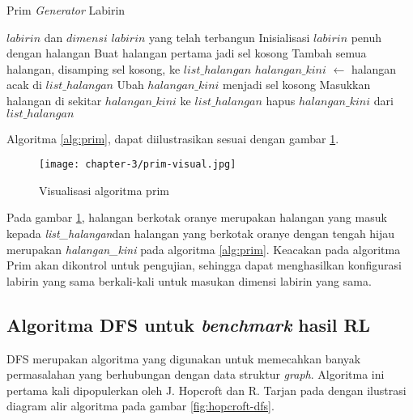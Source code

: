 \begin{algorithm}
	\makeatletter
	\renewcommand{\ALG@name}{Algoritma}
	\makeatother
	\caption{Prim \textit{Generator} Labirin}\label{alg:prim}
	\renewcommand{\algorithmicrequire}{\textbf{Masukan:}}
	\renewcommand{\algorithmicensure}{\textbf{Keluaran:}}
	\begin{algorithmic}[1]
		\Require $labirin$ dan $dimensi$
		\Ensure $labirin$ yang telah terbangun
		\State Inisialisasi $labirin$ penuh dengan halangan
		\State Buat halangan pertama jadi sel kosong
		\State Tambah semua halangan, disamping sel kosong, ke $list\_halangan$
		\State $halangan\_kini$ $\gets$ halangan acak di $list\_halangan$
		\State Ubah $halangan\_kini$ menjadi sel kosong
		\State Masukkan halangan di sekitar $halangan\_kini$ ke $list\_halangan$
		\EndIf
		\State hapus $halangan\_kini$ dari $list\_halangan$
		\EndWhile
	\end{algorithmic}
\end{algorithm}

Algoritma \ref{alg:prim}, dapat diilustrasikan sesuai dengan gambar \ref{fig:prim-visual}.

\begin{figure}[H]
	\centering
	\texttt{[image: chapter-3/prim-visual.jpg]}
	\caption{Visualisasi algoritma prim}
	\label{fig:prim-visual}
\end{figure}

Pada gambar \ref{fig:prim-visual}, halangan berkotak oranye merupakan halangan yang masuk kepada \textit{list\_halangan}dan halangan yang berkotak oranye dengan tengah hijau merupakan \textit{halangan\_kini} pada algoritma \ref{alg:prim}. Keacakan pada algoritma Prim akan dikontrol untuk pengujian, sehingga dapat menghasilkan konfigurasi labirin yang sama berkali-kali untuk masukan dimensi labirin yang sama.

\subsection{Algoritma \ac{DFS} untuk \textit{benchmark} hasil \acl{RL}}
\label{sec:sub-dfs}

\acf{DFS} merupakan algoritma yang digunakan untuk memecahkan banyak permasalahan yang berhubungan dengan data struktur \textit{graph}. Algoritma ini pertama kali dipopulerkan oleh J. Hopcroft dan R. Tarjan pada \parencite{hopcroft1973algorithm} dengan ilustrasi diagram alir algoritma pada gambar \ref{fig:hopcroft-dfs}.

